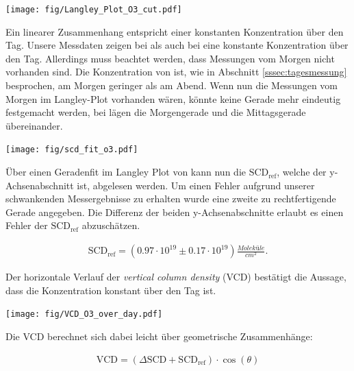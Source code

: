 \documentclass[12pt, a4paper, bibliography=totoc]{scrartcl}
\begin{document}
\begin{multicols}{2}
\begin{center}
	\texttt{[image: fig/Langley\_Plot\_O3\_cut.pdf]}
	\label{fig:langley_O3}
\end{center}

Ein linearer Zusammenhang entspricht einer konstanten Konzentration über den Tag. 
Unsere Messdaten zeigen bei  als auch bei  eine konstante Konzentration über den Tag.
Allerdings muss beachtet werden, dass Messungen vom Morgen nicht vorhanden sind.
Die Konzentration von  ist, wie in Abschnitt \ref{sssec:tagesmessung} besprochen, am Morgen geringer als am Abend.
Wenn nun die Messungen vom Morgen im Langley-Plot vorhanden wären, könnte keine Gerade mehr eindeutig festgemacht werden, bei  lägen die Morgengerade und die Mittagsgerade übereinander.

\begin{center}
	\texttt{[image: fig/scd\_fit\_o3.pdf]}
	\label{fig:scd_fit_o3}
\end{center}

Über einen Geradenfit im Langley Plot von  kann nun die $\text{SCD}_\text{ref}$, welche der y-Achsenabschnitt ist, abgelesen werden. Um einen Fehler aufgrund unserer schwankenden Messergebnisse zu erhalten wurde eine zweite zu rechtfertigende Gerade angegeben. Die Differenz der beiden y-Achsenabschnitte erlaubt es einen Fehler der $\text{SCD}_\text{ref}$ abzuschätzen.
 
\begin{align}
	\text{SCD}_\text{ref}= (0.97 \cdot 10^{19}\pm 0.17 \cdot 10^{19}) \si{\frac{Moleküle}{cm^2}}.
\end{align}	

Der horizontale Verlauf der \textit{vertical column density} (VCD) bestätigt die Aussage, dass die  Konzentration konstant über den Tag ist.

\begin{center}
	\texttt{[image: fig/VCD\_O3\_over\_day.pdf]}
	\label{fig:VCD_O3_over_day}
\end{center} 

Die VCD berechnet sich dabei leicht über geometrische Zusammenhänge: 

\begin{align}
    \text{VCD} = ( \Delta \text{SCD} + \text{SCD}_\text{ref}) \cdot \cos(\theta)
\end{align}


\end{multicols}
\end{document}
